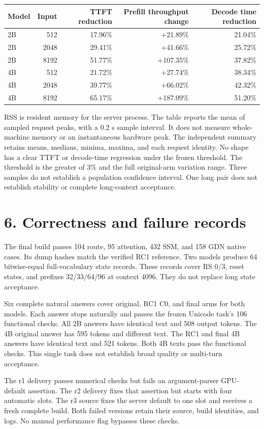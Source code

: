 \documentclass[10pt,a4paper]{article}
\begin{document}
\begin{longtable}[]{@{}lrrrr@{}}
\toprule
Model & Input & TTFT reduction & Prefill throughput change & Decode time
reduction\tabularnewline
\midrule
\endhead
2B & 512 & 17.96\% & +21.89\% & 21.04\%\tabularnewline
2B & 2048 & 29.41\% & +41.66\% & 25.72\%\tabularnewline
2B & 8192 & 51.77\% & +107.35\% & 37.82\%\tabularnewline
4B & 512 & 21.72\% & +27.74\% & 38.34\%\tabularnewline
4B & 2048 & 39.77\% & +66.02\% & 42.32\%\tabularnewline
4B & 8192 & 65.17\% & +187.09\% & 51.20\%\tabularnewline
\bottomrule
\end{longtable}

RSS is resident memory for the server process. The table reports the
mean of sampled request peaks, with a 0.2 s sample interval. It does not
measure whole-machine memory or an instantaneous hardware peak. The
independent summary retains means, medians, minima, maxima, and each
request identity. No shape has a clear TTFT or decode-time regression
under the frozen threshold. The threshold is the greater of 3\% and the
full original-arm variation range. Three samples do not establish a
population confidence interval. One long pair does not establish
stability or complete long-context acceptance.

\hypertarget{correctness-and-failure-records}{%
\section{6. Correctness and failure
records}\label{correctness-and-failure-records}}

The final build passes 104 route, 95 attention, 432 SSM, and 158 GDN
native cases. Its dump hashes match the verified RC1 reference. Two
models produce 64 bitwise-equal full-vocabulary state records. These
records cover RS 0/3, reset states, and prefixes 32/33/64/96 at context
4096. They do not replace long state acceptance.

Six complete natural answers cover original, RC1 C0, and final arms for
both models. Each answer stops naturally and passes the frozen Unicode
task's 106 functional checks. All 2B answers have identical text and 508
output tokens. The 4B original answer has 595 tokens and different text.
The RC1 and final 4B answers have identical text and 521 tokens. Both 4B
texts pass the functional checks. This single task does not establish
broad quality or multi-turn acceptance.

The r1 delivery passes numerical checks but fails an argument-parser
GPU-default assertion. The r2 delivery fixes that assertion but starts
with four automatic slots. The r3 source fixes the server default to one
slot and receives a fresh complete build. Both failed versions retain
their source, build identities, and logs. No manual performance flag
bypasses these checks.
\end{document}

